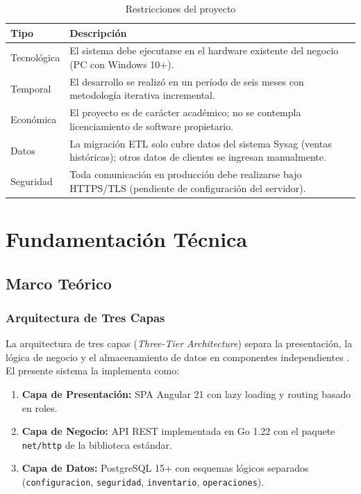 \documentclass[12pt,a4paper,oneside]{report}
\begin{document}
\begin{table}[H]
\centering
\caption{Restricciones del proyecto}
\begin{tabularx}{\textwidth}{|l|X|}
\hline
\rowcolor{lightgray}
\textbf{Tipo} & \textbf{Descripción} \\
\hline
Tecnológica & El sistema debe ejecutarse en el hardware existente del negocio (PC con Windows 10+). \\
\hline
Temporal & El desarrollo se realizó en un período de seis meses con metodología iterativa incremental. \\
\hline
Económica & El proyecto es de carácter académico; no se contempla licenciamiento de software propietario. \\
\hline
Datos & La migración ETL solo cubre datos del sistema Sysag (ventas históricas); otros datos de clientes se ingresan manualmente. \\
\hline
Seguridad & Toda comunicación en producción debe realizarse bajo HTTPS/TLS (pendiente de configuración del servidor). \\
\hline
\end{tabularx}
\label{tab:restricciones}
\end{table}

\chapter{Fundamentación Técnica}

\section{Marco Teórico}

\subsection{Arquitectura de Tres Capas}

La arquitectura de tres capas (\textit{Three-Tier Architecture}) separa la presentación, la lógica de negocio y el almacenamiento de datos en componentes independientes \cite{fowler2002}. El presente sistema la implementa como:

\begin{enumerate}[leftmargin=1.5cm]
  \item \textbf{Capa de Presentación:} SPA Angular 21 con lazy loading y routing basado en roles.
  \item \textbf{Capa de Negocio:} API REST implementada en Go 1.22 con el paquete \texttt{net/http} de la biblioteca estándar.
  \item \textbf{Capa de Datos:} PostgreSQL 15+ con esquemas lógicos separados (\texttt{configuracion}, \texttt{seguridad}, \texttt{inventario}, \texttt{operaciones}).
\end{enumerate}
\end{document}
